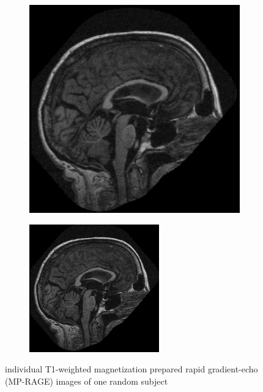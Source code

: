 \begin{figure}
	\begin{subfigure}{.23\textwidth}
		\centering\includegraphics[width=1.013\textwidth]{images/3.png}
	\end{subfigure}
	\begin{subfigure}{.23\textwidth}
		\centering\includegraphics[width=\textwidth]{images/4.png}
	\end{subfigure}
	\caption{individual  T1-weighted  magnetization  prepared  rapid  gradient-echo  (MP-RAGE)  images of one random subject}
	\label{fig:1234}
\end{figure}


